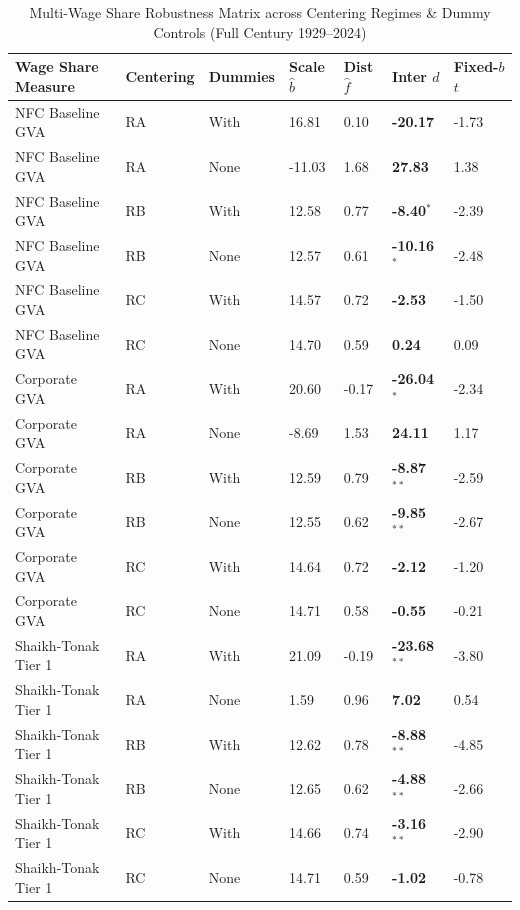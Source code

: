 \begin{table}[h!]
\centering
\small
\caption{Multi-Wage Share Robustness Matrix across Centering Regimes \& Dummy Controls (Full Century 1929--2024)}
\label{tab:baseline_imols_wageshares}
\begin{tabular}{p{3.8cm} p{1.6cm} p{1.6cm} p{1.4cm} p{1.4cm} p{2.0cm} p{1.6cm}}
\toprule
\textbf{Wage Share Measure} & \textbf{Centering} & \textbf{Dummies} & \textbf{Scale $\hat{b}$} & \textbf{Dist $\hat{f}$} & \textbf{Inter $\hat{d}$} & \textbf{Fixed-$b$ $t$} \\
\midrule
NFC Baseline GVA & RA & With & 16.81 & 0.10 & \textbf{-20.17} & -1.73 \\
NFC Baseline GVA & RA & None & -11.03 & 1.68 & \textbf{27.83} & 1.38 \\
NFC Baseline GVA & RB & With & 12.58 & 0.77 & \textbf{-8.40}$^{*}$ & -2.39 \\
NFC Baseline GVA & RB & None & 12.57 & 0.61 & \textbf{-10.16}$^{*}$ & -2.48 \\
NFC Baseline GVA & RC & With & 14.57 & 0.72 & \textbf{-2.53} & -1.50 \\
NFC Baseline GVA & RC & None & 14.70 & 0.59 & \textbf{0.24} & 0.09 \\
Corporate GVA & RA & With & 20.60 & -0.17 & \textbf{-26.04}$^{*}$ & -2.34 \\
Corporate GVA & RA & None & -8.69 & 1.53 & \textbf{24.11} & 1.17 \\
Corporate GVA & RB & With & 12.59 & 0.79 & \textbf{-8.87}$^{**}$ & -2.59 \\
Corporate GVA & RB & None & 12.55 & 0.62 & \textbf{-9.85}$^{**}$ & -2.67 \\
Corporate GVA & RC & With & 14.64 & 0.72 & \textbf{-2.12} & -1.20 \\
Corporate GVA & RC & None & 14.71 & 0.58 & \textbf{-0.55} & -0.21 \\
Shaikh-Tonak Tier 1 & RA & With & 21.09 & -0.19 & \textbf{-23.68}$^{**}$ & -3.80 \\
Shaikh-Tonak Tier 1 & RA & None & 1.59 & 0.96 & \textbf{7.02} & 0.54 \\
Shaikh-Tonak Tier 1 & RB & With & 12.62 & 0.78 & \textbf{-8.88}$^{**}$ & -4.85 \\
Shaikh-Tonak Tier 1 & RB & None & 12.65 & 0.62 & \textbf{-4.88}$^{**}$ & -2.66 \\
Shaikh-Tonak Tier 1 & RC & With & 14.66 & 0.74 & \textbf{-3.16}$^{**}$ & -2.90 \\
Shaikh-Tonak Tier 1 & RC & None & 14.71 & 0.59 & \textbf{-1.02} & -0.78 \\

\end{tabular}
\end{table}
